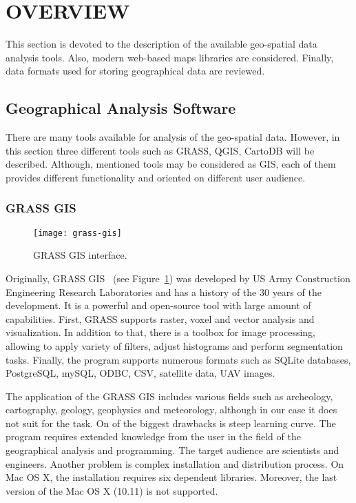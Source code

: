 \section{OVERVIEW}

This section is devoted to the description of the available geo-spatial data analysis tools. Also,
modern web-based maps libraries are considered. Finally, data formats used for storing geographical
data are reviewed.

\subsection{Geographical Analysis Software}

There are many tools available for analysis of the geo-spatial data. However, in this section
three different tools such as GRASS, QGIS, CartoDB will be described. Although, mentioned
tools may be considered as GIS, each of them provides different functionality and oriented
on different user audience.

\subsubsection{GRASS GIS}

\begin{figure}[ht]
  {\par\centering
  \texttt{[image: grass-gis]}
  \par}
  \caption{GRASS GIS interface.}
  \label{pic:grass}
\end{figure}

Originally, GRASS GIS~\cite{grassgis} (see Figure~\ref{pic:grass}) was developed by US Army
Construction Engineering Research Laboratories and has a history of the 30 years of the development.
It is a powerful and open-source tool with large amount of capabilities. First, GRASS supports
raster, voxel and vector analysis and visualization. In addition to that, there is a toolbox for
image processing, allowing to apply variety of filters, adjust histograms and perform segmentation
tasks. Finally, the program supports numerous formats such as SQLite databases, PostgreSQL, mySQL,
ODBC, CSV, satellite data, UAV images.

The application of the GRASS GIS includes various fields such as archeology, cartography, geology,
geophysics and meteorology, although in our case it does not suit for the task. On of the  biggest
drawbacks is steep learning curve. The program requires extended knowledge from  the user in the
field of the geographical analysis and programming. The target audience are scientists and
engineers. Another  problem is complex installation and distribution process. On Mac OS X, the
installation  requires six dependent libraries. Moreover, the last version of the Mac OS X (10.11)
is not  supported.

